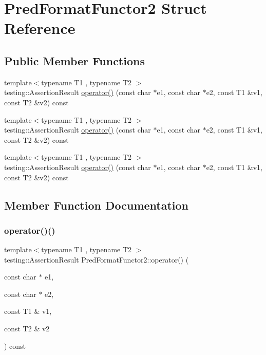 \hypertarget{struct_pred_format_functor2}{}\section{Pred\+Format\+Functor2 Struct Reference}
\label{struct_pred_format_functor2}
\subsection*{Public Member Functions}
\begin{DoxyCompactItemize}
\item 
{\footnotesize template$<$typename T1 , typename T2 $>$ }\\testing\+::\+Assertion\+Result \mbox{\hyperlink{struct_pred_format_functor2_a0169e0105e15d5c63bece2a20646b22b}{operator()}} (const char $\ast$e1, const char $\ast$e2, const T1 \&v1, const T2 \&v2) const
\item 
{\footnotesize template$<$typename T1 , typename T2 $>$ }\\testing\+::\+Assertion\+Result \mbox{\hyperlink{struct_pred_format_functor2_a0169e0105e15d5c63bece2a20646b22b}{operator()}} (const char $\ast$e1, const char $\ast$e2, const T1 \&v1, const T2 \&v2) const
\item 
{\footnotesize template$<$typename T1 , typename T2 $>$ }\\testing\+::\+Assertion\+Result \mbox{\hyperlink{struct_pred_format_functor2_a0169e0105e15d5c63bece2a20646b22b}{operator()}} (const char $\ast$e1, const char $\ast$e2, const T1 \&v1, const T2 \&v2) const
\end{DoxyCompactItemize}


\subsection{Member Function Documentation}
\mbox{\label{struct_pred_format_functor2_a0169e0105e15d5c63bece2a20646b22b}} 
\subsubsection{\texorpdfstring{operator()()}{operator()()}\hspace{0.1cm}{\footnotesize\ttfamily [1/3]}}
{\footnotesize\ttfamily template$<$typename T1 , typename T2 $>$ \\
testing\+::\+Assertion\+Result Pred\+Format\+Functor2\+::operator() (\begin{DoxyParamCaption}\item[{const char $\ast$}]{e1,  }\item[{const char $\ast$}]{e2,  }\item[{const T1 \&}]{v1,  }\item[{const T2 \&}]{v2 }\end{DoxyParamCaption}) const\hspace{0.3cm}{\ttfamily [inline]}}

